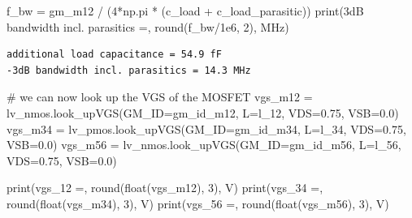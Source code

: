 \documentclass[
  a4paper,
  DIV=11,
  numbers=noendperiod]{scrartcl}
\newenvironment{Shaded}{\begin{snugshade}}{\end{snugshade}}
\newcommand{\BuiltInTok}[1]{\textcolor[rgb]{0.00,0.23,0.31}{#1}}
\newcommand{\CommentTok}[1]{\textcolor[rgb]{0.37,0.37,0.37}{#1}}
\newcommand{\DecValTok}[1]{\textcolor[rgb]{0.68,0.00,0.00}{#1}}
\newcommand{\FloatTok}[1]{\textcolor[rgb]{0.68,0.00,0.00}{#1}}
\newcommand{\NormalTok}[1]{\textcolor[rgb]{0.00,0.23,0.31}{#1}}
\newcommand{\OperatorTok}[1]{\textcolor[rgb]{0.37,0.37,0.37}{#1}}
\newcommand{\StringTok}[1]{\textcolor[rgb]{0.13,0.47,0.30}{#1}}
\begin{document}
\begin{tcolorbox}
\begin{Shaded}
\begin{Highlighting}[]
\NormalTok{f\_bw }\OperatorTok{=}\NormalTok{ gm\_m12 }\OperatorTok{/}\NormalTok{ (}\DecValTok{4}\OperatorTok{*}\NormalTok{np.pi }\OperatorTok{*}\NormalTok{ (c\_load }\OperatorTok{+}\NormalTok{ c\_load\_parasitic))}
\BuiltInTok{print}\NormalTok{(}\StringTok{\textquotesingle{}{-}3dB bandwidth incl. parasitics =\textquotesingle{}}\NormalTok{, }\BuiltInTok{round}\NormalTok{(f\_bw}\OperatorTok{/}\FloatTok{1e6}\NormalTok{, }\DecValTok{2}\NormalTok{), }\StringTok{\textquotesingle{}MHz\textquotesingle{}}\NormalTok{)}
\end{Highlighting}
\end{Shaded}

\begin{verbatim}
additional load capacitance = 54.9 fF
-3dB bandwidth incl. parasitics = 14.3 MHz
\end{verbatim}

\begin{Shaded}
\begin{Highlighting}[]
\CommentTok{\# we can now look up the VGS of the MOSFET}
\NormalTok{vgs\_m12 }\OperatorTok{=}\NormalTok{ lv\_nmos.look\_upVGS(GM\_ID}\OperatorTok{=}\NormalTok{gm\_id\_m12, L}\OperatorTok{=}\NormalTok{l\_12, VDS}\OperatorTok{=}\FloatTok{0.75}\NormalTok{, VSB}\OperatorTok{=}\FloatTok{0.0}\NormalTok{)}
\NormalTok{vgs\_m34 }\OperatorTok{=}\NormalTok{ lv\_pmos.look\_upVGS(GM\_ID}\OperatorTok{=}\NormalTok{gm\_id\_m34, L}\OperatorTok{=}\NormalTok{l\_34, VDS}\OperatorTok{=}\FloatTok{0.75}\NormalTok{, VSB}\OperatorTok{=}\FloatTok{0.0}\NormalTok{) }
\NormalTok{vgs\_m56 }\OperatorTok{=}\NormalTok{ lv\_nmos.look\_upVGS(GM\_ID}\OperatorTok{=}\NormalTok{gm\_id\_m56, L}\OperatorTok{=}\NormalTok{l\_56, VDS}\OperatorTok{=}\FloatTok{0.75}\NormalTok{, VSB}\OperatorTok{=}\FloatTok{0.0}\NormalTok{) }

\BuiltInTok{print}\NormalTok{(}\StringTok{\textquotesingle{}vgs\_12 =\textquotesingle{}}\NormalTok{, }\BuiltInTok{round}\NormalTok{(}\BuiltInTok{float}\NormalTok{(vgs\_m12), }\DecValTok{3}\NormalTok{), }\StringTok{\textquotesingle{}V\textquotesingle{}}\NormalTok{)}
\BuiltInTok{print}\NormalTok{(}\StringTok{\textquotesingle{}vgs\_34 =\textquotesingle{}}\NormalTok{, }\BuiltInTok{round}\NormalTok{(}\BuiltInTok{float}\NormalTok{(vgs\_m34), }\DecValTok{3}\NormalTok{), }\StringTok{\textquotesingle{}V\textquotesingle{}}\NormalTok{)}
\BuiltInTok{print}\NormalTok{(}\StringTok{\textquotesingle{}vgs\_56 =\textquotesingle{}}\NormalTok{, }\BuiltInTok{round}\NormalTok{(}\BuiltInTok{float}\NormalTok{(vgs\_m56), }\DecValTok{3}\NormalTok{), }\StringTok{\textquotesingle{}V\textquotesingle{}}\NormalTok{)}
\end{Highlighting}
\end{Shaded}


\end{tcolorbox}
\end{document}
